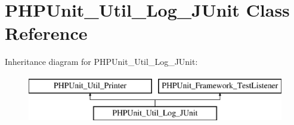 \hypertarget{class_p_h_p_unit___util___log___j_unit}{}\section{P\+H\+P\+Unit\+\_\+\+Util\+\_\+\+Log\+\_\+\+J\+Unit Class Reference}
\label{class_p_h_p_unit___util___log___j_unit}
Inheritance diagram for P\+H\+P\+Unit\+\_\+\+Util\+\_\+\+Log\+\_\+\+J\+Unit\+:\begin{figure}[H]
\begin{center}
\leavevmode
\includegraphics[height=2.000000cm]{class_p_h_p_unit___util___log___j_unit}
\end{center}
\end{figure}
